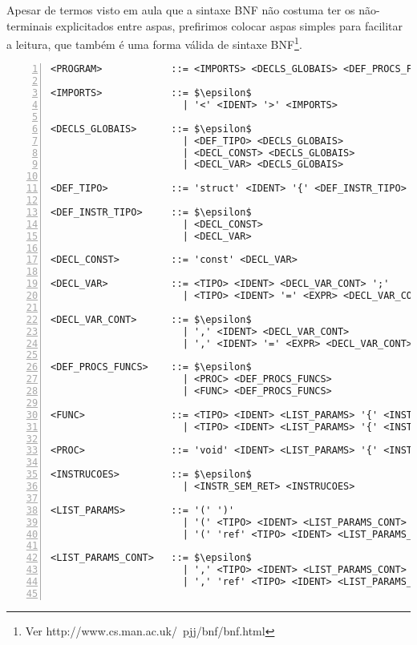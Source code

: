 
Apesar de termos visto em aula que a sintaxe BNF não costuma ter os não-terminais explicitados entre aspas, prefirimos colocar aspas simples para facilitar a leitura, que também é uma forma válida de sintaxe BNF\footnote{Ver http://www.cs.man.ac.uk/~pjj/bnf/bnf.html}.

\begin{lstlisting}[frame=single,numbers=left,breaklines=true,mathescape=true>,basicstyle=\ttfamily\scriptsize]
<PROGRAM>            ::= <IMPORTS> <DECLS_GLOBAIS> <DEF_PROCS_FUNCS> <DEF_MAIN>

<IMPORTS>            ::= $\epsilon$
                       | '<' <IDENT> '>' <IMPORTS>

<DECLS_GLOBAIS>      ::= $\epsilon$
                       | <DEF_TIPO> <DECLS_GLOBAIS>
                       | <DECL_CONST> <DECLS_GLOBAIS>
                       | <DECL_VAR> <DECLS_GLOBAIS>  

<DEF_TIPO>           ::= 'struct' <IDENT> '{' <DEF_INSTR_TIPO> '}'

<DEF_INSTR_TIPO>     ::= $\epsilon$
                       | <DECL_CONST>
                       | <DECL_VAR>

<DECL_CONST>         ::= 'const' <DECL_VAR>

<DECL_VAR>           ::= <TIPO> <IDENT> <DECL_VAR_CONT> ';'
                       | <TIPO> <IDENT> '=' <EXPR> <DECL_VAR_CONT> ';'

<DECL_VAR_CONT>      ::= $\epsilon$
                       | ',' <IDENT> <DECL_VAR_CONT>
                       | ',' <IDENT> '=' <EXPR> <DECL_VAR_CONT>

<DEF_PROCS_FUNCS>    ::= $\epsilon$
                       | <PROC> <DEF_PROCS_FUNCS>
                       | <FUNC> <DEF_PROCS_FUNCS>

<FUNC>               ::= <TIPO> <IDENT> <LIST_PARAMS> '{' <INSTRUCOES> 'return' <EXPR> '}'
                       | <TIPO> <IDENT> <LIST_PARAMS> '{' <INSTRUCOES> 'return' <EXPR> ';' '}'

<PROC>               ::= 'void' <IDENT> <LIST_PARAMS> '{' <INSTRUCOES> '}'

<INSTRUCOES>         ::= $\epsilon$
                       | <INSTR_SEM_RET> <INSTRUCOES>

<LIST_PARAMS>        ::= '(' ')'
                       | '(' <TIPO> <IDENT> <LIST_PARAMS_CONT> ')'
                       | '(' 'ref' <TIPO> <IDENT> <LIST_PARAMS_CONT> ')'

<LIST_PARAMS_CONT>   ::= $\epsilon$
                       | ',' <TIPO> <IDENT> <LIST_PARAMS_CONT>
                       | ',' 'ref' <TIPO> <IDENT> <LIST_PARAMS_CONT>


\end{lstlisting}
